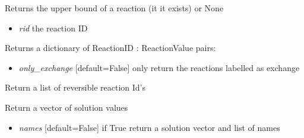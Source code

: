 \documentclass[a4paper,11pt,english]{sphinxmanual}
\begin{document}
\begin{fulllineitems}
\begin{fulllineitems}
\label{modules_doc:cbmpy.CBModel.Model.getReactionUpperBound}
Returns the upper bound of a reaction (it it exists) or None
\begin{itemize}
\item {} 
\emph{rid} the reaction ID

\end{itemize}

\end{fulllineitems}


\begin{fulllineitems}
\label{modules_doc:cbmpy.CBModel.Model.getReactionValues}
Returns a dictionary of ReactionID : ReactionValue pairs:
\begin{itemize}
\item {} 
\emph{only\_exchange} {[}default=False{]} only return the reactions labelled as exchange

\end{itemize}

\end{fulllineitems}


\begin{fulllineitems}
\label{modules_doc:cbmpy.CBModel.Model.getReversibleReactionIds}
Return a list of reversible reaction Id's

\end{fulllineitems}


\begin{fulllineitems}
\label{modules_doc:cbmpy.CBModel.Model.getSolutionVector}
Return a vector of solution values
\begin{itemize}
\item {} 
\emph{names} {[}default=False{]} if True return a solution vector and list of names

\end{itemize}


\end{fulllineitems}
\end{fulllineitems}
\end{document}
